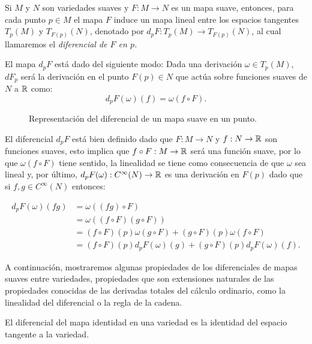 \begin{definition}
	Si $M$ y $N$ son variedades suaves y $F: M \to N$ es un mapa suave, entonces, para cada punto $p \in M$ el mapa $F$ induce un mapa lineal entre los espacios tangentes $T_p(M)$ y $T_{F(p)}(N)$, denotado por $d_pF: T_p(M) \to T_{F(p)}(N)$, al cual llamaremos el \it{diferencial de $F$ en $p$}.

	El mapa $d_pF$ está dado del siguiente modo: Dada una derivación $\omega \in T_p(M)$, $dF_p$ será la derivación en el punto $F(p) \in N$ que actúa sobre funciones suaves de $N$ a $\mathbb{R}$ como:
	\[ d_pF(\omega)(f) = \omega(f \circ F). \]
\end{definition}
\begin{figure}[h]
	\centering
	
	\caption{Representación del diferencial de un mapa suave en un punto.}
\end{figure}
El diferencial $d_pF$ está bien definido dado que $F: M \to N$ y $f: N \to \mathbb{R}$ son funciones suaves, esto implica que $f \circ F: M \to \mathbb{R}$ será una función suave, por lo que $\omega(f \circ F)$ tiene sentido, la linealidad se tiene como consecuencia de que $\omega$ sea lineal y, por último, $d_pF(\omega): C^{\infty}(N) \to \mathbb{R}$ es una derivación en $F(p)$ dado que si $f, g \in C^{\infty}(N)$ entonces:

\begin{align*}
	d_pF(\omega)(fg) & = \omega((fg) \circ F)                                               \\
	                 & = \omega((f \circ F)(g \circ F))                                     \\
	                 & = (f \circ F)(p)\omega(g \circ F) + (g \circ F)(p) \omega(f \circ F) \\
	                 & = (f \circ F)(p)d_pF(\omega)(g) + (g \circ F)(p)d_pF(\omega)(f).
\end{align*}

A continuación, mostraremos algunas propiedades de los diferenciales de mapas suaves entre variedades, propiedades que son extensiones naturales de las propiedades conocidas de las derivadas totales del cálculo ordinario, como la linealidad del diferencial o la regla de la cadena.

\begin{lemma}\label{Lemma: Diferencial del Mapa Identidad}
	El diferencial del mapa identidad en una variedad es la identidad del espacio tangente a la variedad.
\end{lemma}

